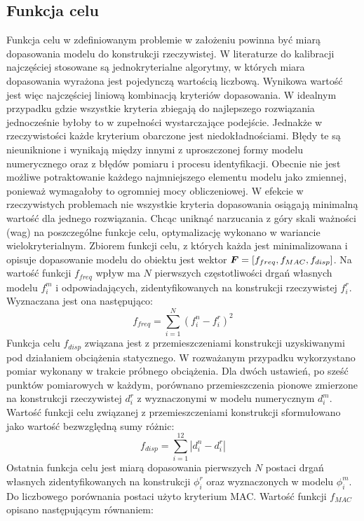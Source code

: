 \subsection{Funkcja celu}
Funkcja celu w zdefiniowanym problemie w założeniu powinna być miarą dopasowania modelu do konstrukcji rzeczywistej. W literaturze do kalibracji najczęściej stosowane są jednokryterialne algorytmy, w których miara dopasowania wyrażona jest pojedynczą wartością liczbową. Wynikowa wartość jest więc najczęściej liniową kombinacją kryteriów dopasowania. W idealnym przypadku gdzie wszystkie kryteria zbiegają do najlepszego rozwiązania jednocześnie byłoby to w zupełności wystarczające podejście. Jednakże w rzeczywistości każde kryterium obarczone jest niedokładnościami. Błędy te są nieuniknione i wynikają między innymi z uproszczonej formy modelu numerycznego oraz z błędów pomiaru i procesu identyfikacji. Obecnie nie jest możliwe potraktowanie każdego najmniejszego elementu modelu jako zmiennej, ponieważ wymagałoby to ogromniej mocy obliczeniowej. W efekcie w rzeczywistych problemach nie wszystkie kryteria dopasowania osiągają minimalną wartość dla jednego rozwiązania. Chcąc uniknąć narzucania z góry skali ważności (wag) na poszczególne funkcje celu, optymalizację wykonano w wariancie wielokryterialnym. Zbiorem funkcji celu, z których każda jest minimalizowana i opisuje dopasowanie modelu do obiektu jest wektor $\bm{F}=[f_{freq},f_{MAC},f_{disp}]$. Na wartość funkcji $f_{freq}$ wpływ ma $N$ pierwszych częstotliwości drgań własnych modelu $f_i^m$ i odpowiadających, zidentyfikowanych na konstrukcji rzeczywistej $f_i^r$. Wyznaczana jest ona następująco:
\begin{equation} \label{eq:wk2_calib_f_freq}
f_{freq}=\sum_{i=1}^{N} (f_i^n - f_i^r)^2
\end{equation}
Funkcja celu $f_{disp}$ związana jest z przemieszczeniami konstrukcji uzyskiwanymi pod działaniem obciążenia statycznego. W rozważanym przypadku wykorzystano pomiar wykonany w trakcie próbnego obciążenia. Dla dwóch ustawień, po sześć punktów pomiarowych w każdym, porównano przemieszczenia pionowe zmierzone na konstrukcji rzeczywistej $d_i^r$ z wyznaczonymi w modelu numerycznym $d_i^m$. Wartość funkcji celu związanej z przemieszczeniami konstrukcji sformułowano jako wartość bezwzględną sumy różnic:
\begin{equation} \label{eq:wk2_calib_f_disp}
	f_{disp}=\sum_{i=1}^{12} |d_i^n - d_i^r|
\end{equation}
Ostatnia funkcja celu jest miarą dopasowania pierwszych $N$ postaci drgań własnych zidentyfikowanych na konstrukcji $\phi_i^r$ oraz wyznaczonych w modelu $\phi_i^m$. Do liczbowego porównania postaci użyto kryterium MAC. Wartość funkcji $f_{MAC}$ opisano następującym równaniem:

